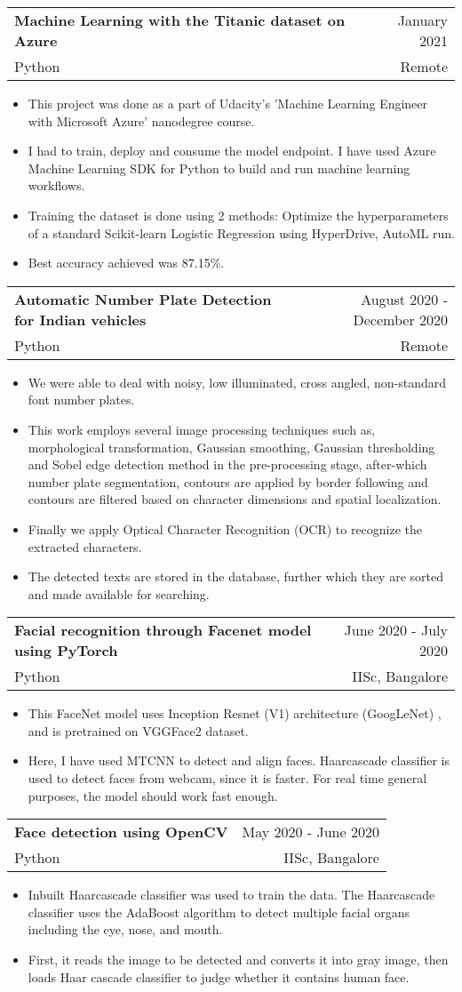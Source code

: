 \documentclass[A4,11pt]{article}
\makeatletter
\newcommand{\CVItem}[1]{
  \item\small{
    {#1 \vspace{-2pt}}
  }
}
\newcommand{\CVSubheading}[4]{
  \vspace{-2pt}\item
    \begin{tabular*}{0.97\textwidth}[t]{l@{\extracolsep{\fill}}r}
      \textbf{#1} & #2 \\
      \small#3 & \small #4 \\
    \end{tabular*}\vspace{-7pt}
}
\newcommand{\CVItemListStart}{\begin{itemize}}
\newcommand{\CVItemListEnd}{\end{itemize}\vspace{-5pt}}
\makeatother
\begin{document}
    \CVSubheading
      {Machine Learning with the Titanic dataset on Azure} {January 2021} {Python}{Remote}
    \CVItemListStart
      \CVItem{This project was done as a part of Udacity's 'Machine Learning Engineer with Microsoft Azure' nanodegree course.}
      \CVItem{I had to train, deploy and consume the model endpoint. I have used Azure Machine Learning SDK for Python to build and run machine learning workflows.}
      \CVItem{Training the dataset is done using 2 methods: Optimize the hyperparameters of a standard Scikit-learn Logistic Regression using HyperDrive, AutoML run.}
      \CVItem{Best accuracy achieved was 87.15\%.}
      \CVItemListEnd
      
    \CVSubheading
      {Automatic Number Plate Detection for Indian vehicles} {August 2020 - December 2020} {Python}{Remote}
    \CVItemListStart
      \CVItem{We were able to deal with noisy, low illuminated, cross angled, non-standard font number plates.}
      \CVItem{This work employs several image processing techniques such as, morphological transformation, Gaussian smoothing, Gaussian thresholding and Sobel edge detection method in the pre-processing stage, after-which number plate segmentation, contours are applied by border following and contours are filtered based on character dimensions and spatial localization. }
      \CVItem{Finally we apply Optical Character Recognition (OCR) to recognize the extracted characters.}
      \CVItem{The detected texts are stored in the database, further which they are sorted and made available for searching.}
      \CVItemListEnd
      
    \CVSubheading
      {Facial recognition through Facenet model using PyTorch} {June 2020 - July 2020} {Python}{IISc, Bangalore}
    \CVItemListStart
      \CVItem{This FaceNet model uses Inception Resnet (V1) architecture (GoogLeNet) , and is pretrained on VGGFace2 dataset. }
      \CVItem{Here, I have used MTCNN to detect and align faces. Haarcascade classifier is used to detect faces from webcam, since it is faster. For real time general purposes, the model should work fast enough.}
      \CVItemListEnd
      
    \CVSubheading
      {Face detection using OpenCV} {May 2020 - June 2020} {Python}{IISc, Bangalore}
    \CVItemListStart
      \CVItem{Inbuilt Haarcascade classifier was used to train the data. The Haarcascade classifier uses the AdaBoost algorithm to detect multiple facial organs including the eye, nose, and mouth. }
      \CVItem{First, it reads the image to be detected and converts it into gray image, then loads Haar cascade classifier to judge whether it contains human face.}
      \CVItemListEnd
      
\end{document}
